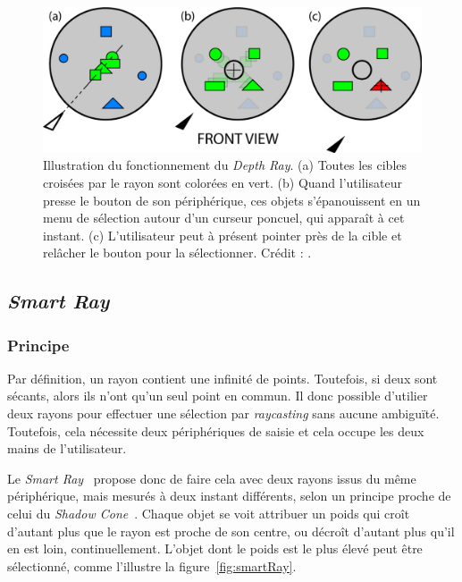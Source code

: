 	\begin{figure}[!htb]
		\centering
		\includegraphics[width=\rayWidth]{figures/ch2/flowerRay}
		\caption[Principe du \emph{Flower Ray}]{Illustration du fonctionnement du \emph{Depth Ray}. (a) Toutes les cibles croisées par le rayon sont colorées en vert. (b) Quand l'utilisateur presse le bouton de son périphérique, ces objets s'épanouissent en un menu de sélection autour d'un curseur poncuel, qui apparaît à cet instant. (c) L'utilisateur peut à présent pointer près de la cible et relâcher le bouton pour la sélectionner. Crédit : \cite{grossman2006design}.}
		\label{fig:flowerRay}
	\end{figure}
	
	\subsection{\emph{Smart Ray}}
	\subsubsection{Principe}
	Par définition, un rayon contient une infinité de points. Toutefois, si deux sont sécants, alors ils n'ont qu'un seul point en commun. Il donc possible d'utilier deux rayons pour effectuer une sélection par \emph{raycasting} sans aucune ambiguïté. Toutefois, cela nécessite deux périphériques de saisie et cela occupe les deux mains de l'utilisateur.
	
	Le \emph{Smart Ray}~\cite{grossman2006design} propose donc de faire cela avec deux rayons issus du même périphérique, mais mesurés à deux instant différents, selon un principe proche de celui du \emph{Shadow Cone}~\cite{steed20043d}. Chaque objet se voit attribuer un \og poids \fg{} qui croît d'autant plus que le rayon est proche de son centre, ou décroît d'autant plus qu'il en est loin, continuellement. L'objet dont le poids est le plus élevé peut être sélectionné, comme l'illustre la figure~\ref{fig:smartRay}.
	
